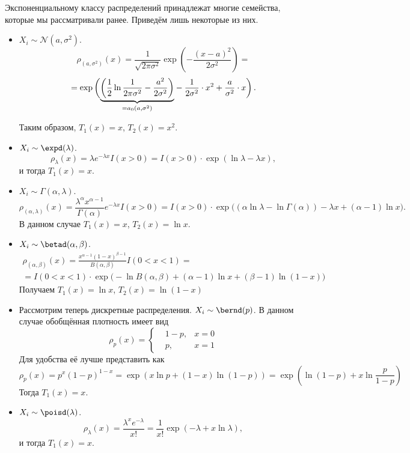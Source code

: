 \begin{example}
    Экспоненциальному классу распределений принадлежат многие семейства, которые мы рассматривали ранее. Приведём лишь некоторые из них.
    \begin{itemize}
        \item $X_i \sim \mathcal N(a, \sigma^2)$.
        \[
            \rho_{(a, \sigma^2)}(x) = \frac{1}{\sqrt{2\pi\sigma^2}}\exp\left(-\frac{(x - a)^2}{2\sigma^2}\right) =
        \]
        \[
            = \exp\left(\smash{\underbrace{\left(\frac{1}{2}\ln{\frac{1}{2\pi\sigma^2}} - \frac{a^2}{2\sigma^2}\right)}_{= a_0(a, \sigma^2)}} - \frac{1}{2\sigma^2} \cdot x^2 + \frac{a}{\sigma^2} \cdot x\right)
            \vphantom{\underbrace{\left(\frac{1}{2}\ln{\frac{1}{2\pi\sigma^2}} - \frac{a^2}{2\sigma^2}\right)}_{= a_0(a, \sigma^2)}}.
        \]
        
        Таким образом, $T_1(x)=x$, $T_2(x)=x^2$.
        \item $X_i \sim \expd(\lambda)$.
        \[
        \rho_{\lambda}(x) = \lambda e^{-\lambda x} I(x > 0) = I(x>0)\cdot \exp(\ln{\lambda} - \lambda x),
        \]
        и тогда $T_1(x) = x$.
        
        \item $X_i \sim \Gamma(\alpha, \lambda)$.
        \[
        \rho_{(\alpha, \lambda)}(x) = \frac{\lambda^{\alpha}x^{\alpha-1}}{\Gamma(\alpha)}e^{-\lambda x}I(x > 0) = I(x > 0) \cdot \exp\bigl((\alpha\ln\lambda - \ln{\Gamma(\alpha)}) - \lambda x + (\alpha - 1)\ln{x}\bigr).
        \]
        В данном случае $T_1(x)=x$, $T_2(x)=\ln{x}$.
        \item $X_i \sim \betad(\alpha, \beta)$.
        \begin{gather*}
            \rho_{(\alpha, \beta)}(x) = \frac{x^{\alpha - 1}(1-x)^{\beta - 1}}{B(\alpha, \beta)}I(0 < x < 1) = \\
            = I(0 < x < 1)\cdot  \exp\bigl(-\ln{B(\alpha, \beta)} + (\alpha - 1)\ln{x} + (\beta - 1)\ln{(1 - x)} \bigr)
        \end{gather*}
        Получаем $T_1(x)=\ln{x}$, $T_2(x)=\ln{(1-x)}$
        \item Рассмотрим теперь дискретные распределения. $X_i \sim \bernd(p)$. В данном случае обобщённая плотность имеет вид
        \[
        \rho_{p}(x) = \left\{
        \begin{aligned}
            &1 - p, &x = 0\\
            &p, &x = 1
        \end{aligned}
        \right.
        \]
        Для удобства её лучше представить как
        \[
        \rho_{p}(x) = p^x(1-p)^{1-x} = \exp(x\ln{p} + (1 - x)\ln{(1-p)}) = \exp\left(\ln{(1 - p)} + x\ln{\frac{p}{1-p}}\right)
        \]
        Тогда $T_1(x) = x$.
        \item $X_i \sim \poisd(\lambda)$. 
        \[
        \rho_{\lambda}(x) = \frac{\lambda^x e^{-\lambda}}{x!} = \frac{1}{x!} \exp(-\lambda + x \ln{\lambda}),
        \]
        и тогда $T_1(x) = x$.
    \end{itemize}
\end{example}

